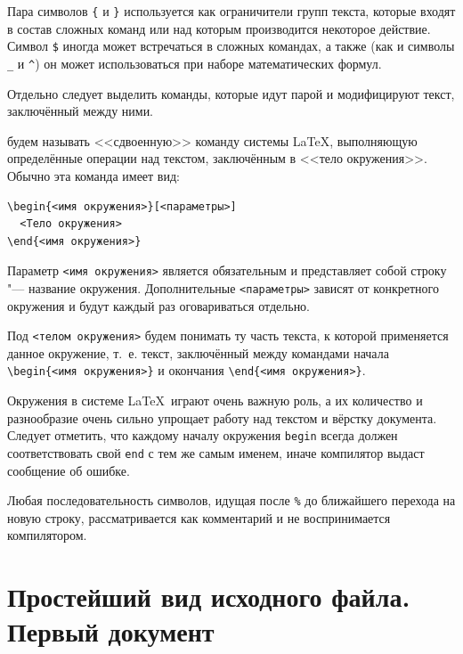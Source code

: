Пара символов \verb|{| и \verb|}| используется как ограничители групп текста, которые входят в состав сложных команд или над которым производится некоторое действие. Символ \verb|$| иногда может встречаться в сложных командах, а также (как и символы \verb|_| и \verb|^|) он может использоваться при наборе математических формул.

Отдельно следует выделить команды, которые идут парой и модифицируют текст, заключённый между ними.

 будем называть <<сдвоенную>> команду системы \LaTeX, выполняющую определённые операции над текстом, заключённым в <<тело окружения>>. Обычно эта команда имеет вид:
\begin{verbatim}
\begin{<имя окружения>}[<параметры>]
  <Тело окружения>
\end{<имя окружения>}
\end{verbatim}

Параметр \verb|<имя окружения>| является обязательным и представляет собой строку "--- название окружения. Дополнительные \texttt{<параметры>} зависят от конкретного окружения и будут каждый раз оговариваться отдельно.

Под \verb|<телом окружения>| будем понимать ту часть текста, к которой применяется данное окружение, т.~е. текст, заключённый между командами начала \verb|\begin{<имя окружения>}| и окончания \verb|\end{<имя окружения>}|.

Окружения в системе \LaTeX\ играют очень важную роль, а их количество и разнообразие очень сильно упрощает работу над текстом и вёрстку документа. Следует отметить, что каждому началу окружения \verb|begin| всегда должен соответствовать свой \verb|end| с тем же самым именем, иначе компилятор выдаст сообщение об ошибке.

\begin{note}
Любая последовательность символов, идущая после \verb|%| до ближайшего перехода на новую строку, рассматривается как комментарий и не воспринимается компилятором.
\end{note}





\section{Простейший вид исходного файла. Первый документ}\label{Sec:FirstDoc}

